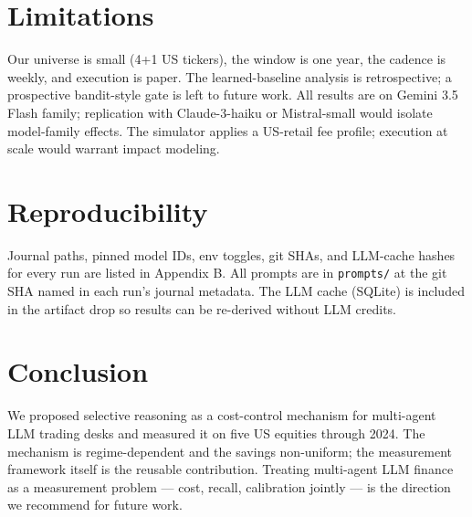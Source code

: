 \documentclass[11pt,a4paper]{article}
\begin{document}
\section{Limitations}
\label{sec:limitations}

Our universe is small (4+1 US tickers), the window is one year, the
cadence is weekly, and execution is paper. The learned-baseline
analysis is retrospective; a prospective bandit-style gate is left to
future work. All results are on Gemini 3.5 Flash family; replication
with Claude-3-haiku or Mistral-small would isolate model-family effects.
The simulator applies a US-retail fee profile; execution at scale
would warrant impact modeling.

\section{Reproducibility}
\label{sec:reproducibility}

Journal paths, pinned model IDs, env toggles, git SHAs, and LLM-cache
hashes for every run are listed in Appendix B. All prompts are in
\verb|prompts/| at the git SHA named in each run's journal metadata.
The LLM cache (SQLite) is included in the artifact drop so results
can be re-derived without LLM credits.

\section{Conclusion}
\label{sec:conclusion}

We proposed selective reasoning as a cost-control mechanism for
multi-agent LLM trading desks and measured it on five US equities
through 2024. The mechanism is regime-dependent and the savings
non-uniform; the measurement framework itself is the reusable
contribution. Treating multi-agent LLM finance as a measurement
problem --- cost, recall, calibration jointly --- is the direction we
recommend for future work.
\end{document}
